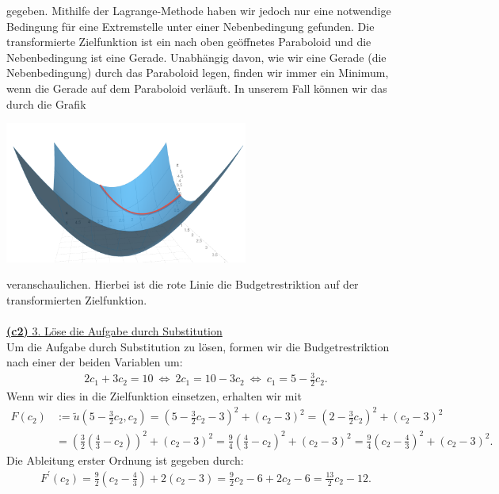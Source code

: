 gegeben. Mithilfe der Lagrange-Methode haben wir jedoch nur eine notwendige Bedingung für eine Extremstelle unter einer Nebenbedingung gefunden.
Die transformierte Zielfunktion ist ein nach oben geöffnetes Paraboloid und die Nebenbedingung ist eine Gerade.
Unabhängig davon, wie wir eine Gerade (die Nebenbedingung) durch das Paraboloid legen, finden wir immer ein Minimum, wenn die Gerade auf dem Paraboloid verläuft.
\newpage
In unserem Fall können wir das durch die Grafik
\begin{center}
	\includegraphics[width=0.6\textwidth]{pictures/aufgabe1_c}
\end{center}
veranschaulichen.
Hierbei ist die rote Linie die Budgetrestriktion auf der transformierten Zielfunktion.\\
\\
\underline{\textbf{(c2)} 3. Löse die Aufgabe durch Substitution}\\
Um die Aufgabe durch Substitution zu lösen, formen wir die Budgetrestriktion nach einer der beiden Variablen um:
\begin{align*}
	2 c_1 + 3 c_2 = 10
	\ \Leftrightarrow \ 
	2c_1 = 10 - 3 c_2 
	\ \Leftrightarrow \
	c_1 = 5 - \frac{3}{2} c_2.
\end{align*}
Wenn wir dies in die Zielfunktion einsetzen, erhalten wir mit
\begin{align*}
	F(c_2)
	&:= 
	\tilde{u}\left(5 - \frac{3}{2} c_2, c_2\right)
	= 
	\left(5 - \frac{3}{2} c_2 -3 \right)^2 + (c_2 -3 )^2
	=
	\left(2 - \frac{3}{2} c_2\right)^2 + (c_2 -3)^2\\
	&=
	\left(\frac{3}{2} \left(\frac{4}{3} -  c_2 \right) \right)^2 + (c_2 -3)^2
	=
	\frac{9}{4} \left(\frac{4}{3} - c_2\right)^2 + (c_2 -3)^2
	=
	\frac{9}{4} \left(c_2 -\frac{4}{3} \right)^2 + (c_2 -3)^2.
\end{align*}
Die Ableitung erster Ordnung ist gegeben durch:
\begin{align*}
	F^\prime(c_2)
	=
	\frac{9}{2} \left(c_2 - \frac{4}{3}\right) + 2 (c_2 -3)
	=
	\frac{9}{2} c_2 - 6 + 2 c_2 - 6
	=
	\frac{13}{2} c_2 -12.
\end{align*}
